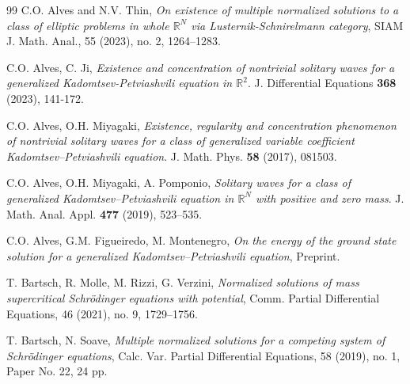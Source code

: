 \documentclass[11pt]{amsart}
\numberwithin{equation}{section}
\newcommand\R{\mathbb R}
\begin{document}
{{{\begin{thebibliography}{99}
 C.O. Alves and N.V. Thin, {\it On existence of multiple normalized solutions to a class of elliptic problems in whole $\mathbb{R}^N$ via Lusternik-Schnirelmann category},
SIAM J. Math. Anal., 55 (2023), no. 2, 1264--1283.


  C.O. Alves, C. Ji,  \emph{Existence and concentration of nontrivial solitary waves for a generalized Kadomtsev-Petviashvili equation in $\mathbb{R}^2$}. J. Differential Equations  \textbf{368} (2023), 141-172.


 C.O. Alves, O.H. Miyagaki, \emph{Existence, regularity and concentration phenomenon of nontrivial solitary waves for a class of generalized variable coefficient Kadomtsev--Petviashvili equation}. J. Math. Phys. \textbf{58} (2017), 081503.



 C.O. Alves, O.H. Miyagaki, A. Pomponio, \emph{Solitary waves for a class of generalized Kadomtsev--Petviashvili
    equation in $\mathbb{R}^N$ with positive and zero mass}. J. Math. Anal. Appl. \textbf{477} (2019), 523--535.

 C.O. Alves, G.M. Figueiredo, M. Montenegro, \emph{On the energy of the  ground state solution for a generalized Kadomtsev--Petviashvili equation}, Preprint.




  T. Bartsch, R. Molle, M. Rizzi, G. Verzini, {\it Normalized solutions of mass supercritical Schr\"odinger  equations with potential},  Comm. Partial Differential Equations, 46 (2021), no. 9, 1729--1756.

 T. Bartsch, N. Soave, {\it Multiple normalized solutions for a competing system of Schr\"odinger equations}, Calc. Var. Partial Differential Equations, 58 (2019), no. 1, Paper No. 22, 24 pp.


\end{thebibliography}}}}
\end{document}
